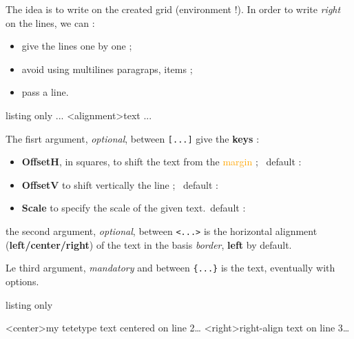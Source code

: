 \documentclass[a4paper]{article}
\newcommand\Cle[1]{{\bfseries\sffamily\textlangle #1\textrangle}}
\begin{document}
The idea is to write on the created grid (environment !). In order to write \textit{right} on the lines, we can :

\begin{itemize}
	\item give the lines one by one ;
	\item avoid using multilines paragraps, items ;
	\item pass a line.
\end{itemize}

\begin{PresentationCode}{listing only}
...
	\WriteLine[keys]<alignment>{text}
	\PassLine
...
\end{PresentationCode}

The fisrt argument, \textit{optional}, between \texttt{[...]} give the \Cle{keys} :

\begin{itemize}
	\item \Cle{OffsetH}, in squares, to shift the text from the \textcolor{orange}{margin} ; \hfill~default : \Cle{0}
	\item \Cle{OffsetV} to shift vertically the line ; \hfill~default : \Cle{0pt}
	\item \Cle{Scale} to specify the scale of the given text.\hfill~default : \Cle{1}
\end{itemize}

the second argument, \textit{optional}, between \texttt{<...>} is the horizontal alignment (\Cle{left/center/right}) of the text in the basis \textcolor{green!50!black}{\textit{border}}, \Cle{left} by default.

\medskip

Le third argument, \textit{mandatory} and between \texttt{\{...\}} is the text, eventually with options.

\begin{PresentationCode}{listing only}
\begin{EnvGrid}[NumSquares=36x8]
	\WriteLine[Scale=1.5]<center>{\ttfamily my tetetype text centered on line 2\ldots}
	\WriteLine[Scale=1.5]<right>{right-align text on line 3\ldots}
	\WriteLine[Scale=1.5,OffsetH=0.1]{\textcolor{red}{red text, 1mm-shifted\ldots}}
	\PassLine
\end{EnvGrid}
\end{PresentationCode}
\end{document}
